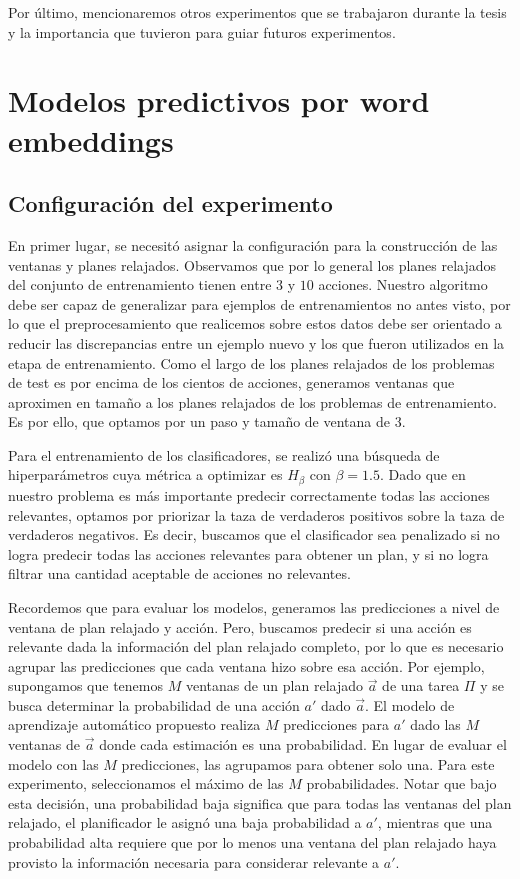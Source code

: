 Por último, mencionaremos otros experimentos que se trabajaron durante la tesis
y la importancia que tuvieron para guiar futuros experimentos.

\section{Modelos predictivos por word embeddings}
\label{exp:ad-hoc}

\subsection{Configuración del experimento}

En primer lugar, se necesitó asignar la configuración para la construcción de
las ventanas y planes relajados.  Observamos que por lo general los planes
relajados del conjunto de entrenamiento tienen entre $3$ y $10$ acciones.
Nuestro algoritmo debe ser capaz de generalizar para ejemplos de entrenamientos
no antes visto, por lo que el preprocesamiento que realicemos sobre estos datos
debe ser orientado a reducir las discrepancias entre un ejemplo nuevo y los que
fueron utilizados en la etapa de entrenamiento. Como el largo de los planes
relajados de los problemas de test es por encima de los cientos de acciones,
generamos ventanas que aproximen en tamaño a los planes relajados de los
problemas de entrenamiento. Es por ello, que optamos por un paso y tamaño de
ventana de $3$.

Para el entrenamiento de los clasificadores, se realizó una búsqueda de
hiperparámetros cuya métrica a optimizar es $H_{\beta}$ con $\beta = 1.5$. Dado
que en nuestro problema es más importante predecir correctamente todas las
acciones relevantes, optamos por priorizar la taza de verdaderos positivos sobre
la taza de verdaderos negativos. Es decir, buscamos que el clasificador sea
penalizado si no logra predecir todas las acciones relevantes para obtener un
plan, y si no logra filtrar una cantidad aceptable de acciones no relevantes.

Recordemos que para evaluar los modelos, generamos las predicciones a nivel de
ventana de plan relajado y acción. Pero, buscamos predecir si una acción
es relevante dada la información del plan relajado completo, por lo que es
necesario agrupar las predicciones que cada ventana hizo sobre esa acción.
Por ejemplo, supongamos que tenemos $M$ ventanas de un plan relajado $\vec{a}$
de una tarea $\Pi$ y se busca determinar la probabilidad de una acción $a'$ dado
$\vec{a}$. El modelo de aprendizaje automático propuesto realiza $M$
predicciones para $a'$ dado las $M$ ventanas de $\vec{a}$ donde cada estimación
es una probabilidad. En lugar de evaluar el modelo con las $M$ predicciones, las
agrupamos para obtener solo una. Para este experimento, seleccionamos el máximo
de las $M$ probabilidades. Notar que bajo esta decisión, una probabilidad baja
significa que para todas las ventanas del plan relajado, el planificador le
asignó una baja probabilidad a $a'$, mientras que una probabilidad alta requiere
que por lo menos una ventana del plan relajado haya provisto la información
necesaria para considerar relevante a $a'$.

